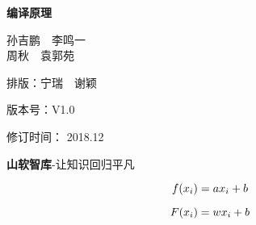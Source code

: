\documentclass[UTF8]{ctexart}
\renewenvironment{shaded}{
                     \def\FrameCommand{\fboxsep=\FrameSep \colorbox{shadecolor}}
                     \MakeFramed{\advance\hsize-\width \FrameRestore\FrameRestore}}
                    {\endMakeFramed}
\begin{document}
\begin{center}
    \vspace{3cm}
    {\textbf{编译原理}}

    {孙吉鹏~~李鸣一\\周\hspace{1em}秋~~袁郭苑}
    
    {排版：宁瑞~~谢颖}

    {版本号：V1.0}

    {修订时间： 2018.12}

    {\textbf{山软智库}-让知识回归平凡}
\end{center}


\newpage
\normalsize


\[
f(x_i)=ax_i+b\\
\]


\begin{shaded}
\[
F(x_i) = wx_i+b\\
\]


\end{shaded}
\end{document}
